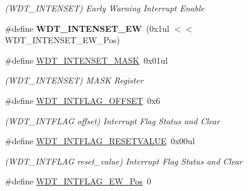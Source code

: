 \begin{DoxyCompactItemize}
\begin{DoxyCompactList}\small\item\em (W\+D\+T\+\_\+\+I\+N\+T\+E\+N\+S\+E\+T) Early Warning Interrupt Enable \end{DoxyCompactList}\item 
\hypertarget{group___s_a_m_l21___w_d_t_ga41315bef38a49717163e34abd09091bb}{}\#define {\bfseries W\+D\+T\+\_\+\+I\+N\+T\+E\+N\+S\+E\+T\+\_\+\+E\+W}~(0x1ul $<$$<$ W\+D\+T\+\_\+\+I\+N\+T\+E\+N\+S\+E\+T\+\_\+\+E\+W\+\_\+\+Pos)\label{group___s_a_m_l21___w_d_t_ga41315bef38a49717163e34abd09091bb}

\item 
\hypertarget{group___s_a_m_l21___w_d_t_ga3b4c09a36c0f08d32b983e12e06c706f}{}\#define \hyperlink{group___s_a_m_l21___w_d_t_ga3b4c09a36c0f08d32b983e12e06c706f}{W\+D\+T\+\_\+\+I\+N\+T\+E\+N\+S\+E\+T\+\_\+\+M\+A\+S\+K}~0x01ul\label{group___s_a_m_l21___w_d_t_ga3b4c09a36c0f08d32b983e12e06c706f}

\begin{DoxyCompactList}\small\item\em (W\+D\+T\+\_\+\+I\+N\+T\+E\+N\+S\+E\+T) M\+A\+S\+K Register \end{DoxyCompactList}\item 
\hypertarget{group___s_a_m_l21___w_d_t_ga8ccc2de815933812cd609179de30fc5b}{}\#define \hyperlink{group___s_a_m_l21___w_d_t_ga8ccc2de815933812cd609179de30fc5b}{W\+D\+T\+\_\+\+I\+N\+T\+F\+L\+A\+G\+\_\+\+O\+F\+F\+S\+E\+T}~0x6\label{group___s_a_m_l21___w_d_t_ga8ccc2de815933812cd609179de30fc5b}

\begin{DoxyCompactList}\small\item\em (W\+D\+T\+\_\+\+I\+N\+T\+F\+L\+A\+G offset) Interrupt Flag Status and Clear \end{DoxyCompactList}\item 
\hypertarget{group___s_a_m_l21___w_d_t_gac9159591ef9fa9ebb4958fa38ad9b56c}{}\#define \hyperlink{group___s_a_m_l21___w_d_t_gac9159591ef9fa9ebb4958fa38ad9b56c}{W\+D\+T\+\_\+\+I\+N\+T\+F\+L\+A\+G\+\_\+\+R\+E\+S\+E\+T\+V\+A\+L\+U\+E}~0x00ul\label{group___s_a_m_l21___w_d_t_gac9159591ef9fa9ebb4958fa38ad9b56c}

\begin{DoxyCompactList}\small\item\em (W\+D\+T\+\_\+\+I\+N\+T\+F\+L\+A\+G reset\+\_\+value) Interrupt Flag Status and Clear \end{DoxyCompactList}\item 
\hypertarget{group___s_a_m_l21___w_d_t_gad92b31e2c0815fceba1ace8b061ffe25}{}\#define \hyperlink{group___s_a_m_l21___w_d_t_gad92b31e2c0815fceba1ace8b061ffe25}{W\+D\+T\+\_\+\+I\+N\+T\+F\+L\+A\+G\+\_\+\+E\+W\+\_\+\+Pos}~0\label{group___s_a_m_l21___w_d_t_gad92b31e2c0815fceba1ace8b061ffe25}


\end{DoxyCompactItemize}
